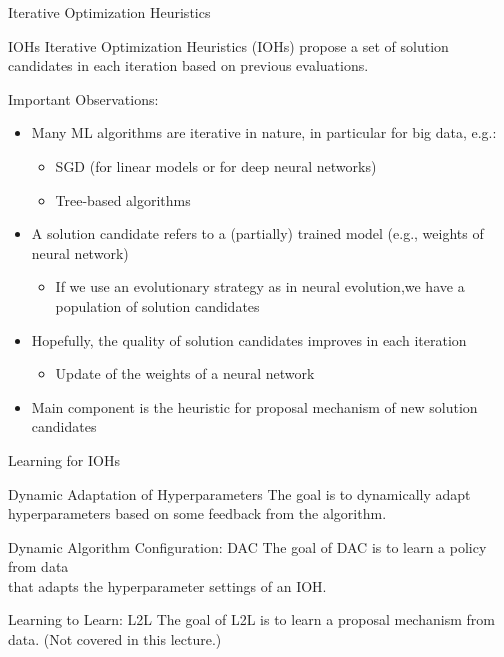 \begin{frame}[c]{Iterative Optimization Heuristics}

\begin{block}{IOHs}
	Iterative Optimization Heuristics (IOHs) propose a set of solution candidates in each iteration
	based on previous evaluations.
\end{block}

\pause
\smallskip
Important Observations:
\begin{itemize}
	\item Many ML algorithms are  \alert{iterative} in nature, in particular for big data, e.g.:
	\begin{itemize}
		\item SGD (for linear models or for deep neural networks)
		\item Tree-based algorithms
	\end{itemize}
	\pause
	\smallskip
	\item A \alert{solution candidate} refers to a (partially) trained model (e.g., weights of neural network)
	\begin{itemize}
		\item If we use an evolutionary strategy as in neural evolution,\newline we have a population of solution candidates
	\end{itemize}
	\pause
	\smallskip
	\item Hopefully, the \alert{quality} of solution candidates \alert{improves} in each iteration
	\begin{itemize}
		\item Update of the weights of a neural network
	\end{itemize}
	\pause
	\smallskip
	\item Main component is the \alert{heuristic for proposal mechanism} of new solution candidates
\end{itemize}

\end{frame}
\begin{frame}[c]{Learning for IOHs}

\begin{block}{Dynamic Adaptation of Hyperparameters}
	The goal is to dynamically adapt hyperparameters based on some feedback from the algorithm.
\end{block}

\bigskip
\pause	

\begin{block}{Dynamic Algorithm Configuration: DAC}
	The goal of DAC is to learn a policy from data\\ that adapts the \alert{hyperparameter settings} of an IOH.
\end{block}

\bigskip
\pause

\begin{block}{Learning to Learn: L2L}
	The goal of L2L is to learn a \alert{proposal mechanism} from data. (Not covered in this lecture.)
\end{block}
	
\end{frame}
